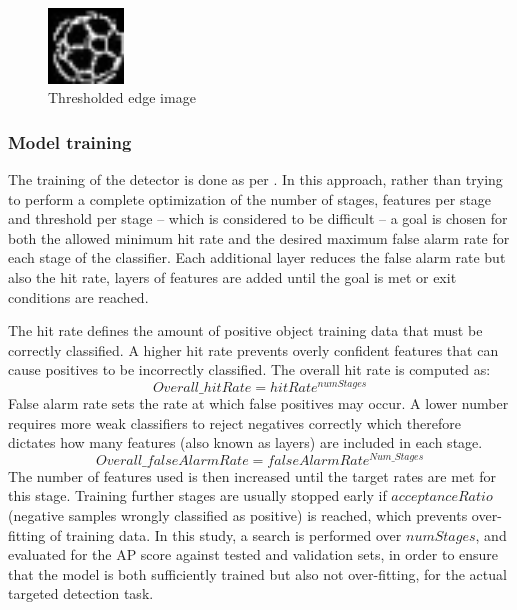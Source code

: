 \documentclass[a4paper,twoside,12pt]{report}
\begin{document}
\begin{figure}[h!]
\begin{center}
\includegraphics[width=2cm]{images/edge32.png}
\caption{Thresholded edge image}
\label{fig:edgeball}
\end{center}
\end{figure}

\subsubsection{Model training}

The training of the detector is done as per \cite{vjdet}. In this approach, rather than trying to perform a complete optimization of the number of stages, features per stage and threshold per stage -- which is considered to be difficult -- a goal is chosen for both the allowed minimum hit rate and the desired maximum false alarm rate for each stage of the classifier. Each additional layer reduces the false alarm rate but also the hit rate, layers of features are added until the goal is met or exit conditions are reached.

The hit rate defines the amount of positive object training data that must be correctly classified. A higher hit rate prevents overly confident features that can cause positives to be incorrectly classified. The overall hit rate is computed as:
\begin{equation}
Overall\_hitRate = hitRate^{numStages}
\end{equation}
False alarm rate sets the rate at which false positives may occur. A lower number requires more weak classifiers to reject negatives correctly which therefore dictates how many features (also known as layers) are included in each stage. 
\begin{equation}
Overall\_falseAlarmRate = falseAlarmRate^{Num\_Stages}
\end{equation}
The number of features used is then increased until the target rates are met for this stage. Training further stages are usually stopped early if $acceptanceRatio$ (negative samples wrongly classified as positive) is reached, which prevents over-fitting of training data. In this study, a search is performed over $numStages$, and evaluated for the AP score against tested and validation sets, in order to ensure that the model is both sufficiently trained but also not over-fitting, for the actual targeted detection task.  
\end{document}
